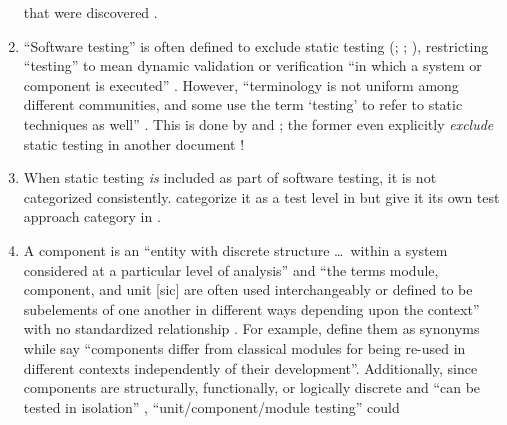 \begin{enumerate}
          that were discovered \citep[p.~427]{vanVliet2000}.
    \item %
          ``Software testing'' is often defined to exclude static testing
          (\citealp[p.~13]{Firesmith2015}; \citealp[p.~222]{AmmannAndOffutt2017};
          \citealp[p.~439]{PetersAndPedrycz2000}), restricting ``testing'' to
          mean dynamic validation \citep[p.~5\=/1]{SWEBOK2024} or verification
          ``in which a system or component is executed'' \citep[p.~427]{IEEE2017}.
          However, ``terminology is not uniform among different communities, and
          some use the term `testing' to refer to static techniques%
           as well'' \citep[p.~5\=/2]{SWEBOK2024}.
          This is done by \citet[pp.~16\==17]{IEEE2022} and
          \citet[pp.~8\==9]{Gerrard2000a}; the former even explicitly
          \emph{exclude} static testing in another
          document \citeyearpar[p.~440]{IEEE2017}!
    \item %
          When static testing \emph{is} included as part of software testing,
          it is not categorized consistently. \citeauthor{IEEE2021b} categorize
          it as a test level in \citeyearpar[p.~43]{IEEE2021b} but give it its
          own test approach category in \citeyearpar[p.~10, 23, Fig.~2]{IEEE2022}.
    \item %
          A component is an ``entity with discrete structure \dots\ within a
          system considered at a particular level of analysis''
          \citep{ISO_IEC2023b} and ``the terms module, component, and unit
              [sic] are often used interchangeably or defined to be subelements
          of one another in different ways depending upon the context'' with
          no standardized relationship \citep[p.~82]{IEEE2017}. For example,
          \citetISTQB{} define them as synonyms while
          \citet[p.~107]{BaresiAndPezzè2006} say ``components
          differ from classical modules for being re-used in different contexts
          independently of their development''.
          Additionally, since components are structurally, functionally, or
          logically discrete \citep[p.~419]{IEEE2017} and ``can be tested in
          isolation'' \citepISTQB{}, ``unit/component/module testing'' could

\end{enumerate}
